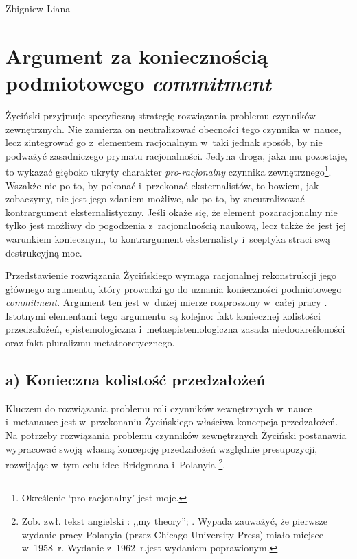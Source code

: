 \begin{artplenv}{Zbigniew Liana}
\section{Argument za koniecznością podmiotowego \textit{commitment}}
Życiński przyjmuje specyficzną strategię rozwiązania problemu czynników zewnętrznych. Nie zamierza on neutralizować obecności tego czynnika w~nauce, lecz zintegrować go z~elementem racjonalnym w~taki jednak sposób, by nie podważyć zasadniczego prymatu racjonalności. Jedyna droga, jaka mu pozostaje, to wykazać głęboko ukryty charakter \textit{pro}-\textit{racjonalny} czynnika zewnętrznego\footnote{Określenie ‘pro-racjonalny' jest moje.}. Wszakże nie po to, by pokonać i~przekonać eksternalistów, to bowiem, jak zobaczymy, nie jest jego zdaniem możliwe, ale po to, by zneutralizować kontrargument eksternalistyczny. Jeśli okaże się, że element pozaracjonalny nie tylko jest możliwy do pogodzenia z~racjonalnością naukową, lecz także że jest jej warunkiem koniecznym, to kontrargument eksternalisty i~sceptyka straci swą destrukcyjną moc.

Przedstawienie rozwiązania Życińskiego wymaga racjonalnej rekonstrukcji jego głównego argumentu, który prowadzi go do uznania konieczności podmiotowego \textit{commitment}. Argument ten jest w~dużej mierze rozproszony w~całej pracy
\parencite[][]{zycinski_teizm_1985}. %
 Istotnymi elementami tego argumentu są kolejno: fakt koniecznej kolistości przedzałożeń, epistemologiczna i~metaepistemologiczna zasada niedookreśloności oraz fakt pluralizmu metateoretycznego.

\subsection{a) Konieczna kolistość przedzałożeń}

Kluczem do rozwiązania problemu roli czynników zewnętrznych w~nauce i~metanauce jest w~przekonaniu Życińskiego
\parencite*[][s.~7]{zycinski_teizm_1985} %
 właściwa koncepcja przedzałożeń. Na potrzeby rozwiązania problemu czynników zewnętrznych Życiński postanawia wypracować swoją własną koncepcję przedzałożeń względnie presupozycji, rozwijając w~tym celu idee Bridgmana 
\parencite*[][]{bridgman_reflections_1950} %
 i~Polanyia 
\parencite*[][]{polanyi_personal_1962}%
\footnote{Zob. zwł. tekst angielski 
\parencite[][s.~202]{zycinski_structure_1988}: %
 ,,my theory''; 
\parencites[por.][s.~351]{zycinski_struktura_2013_liana}[zob. także][s.~145]{zycinski_structure_1988}[][s.~256]{zycinski_struktura_2013_liana}[][s.~187 przypis 283]{zycinski_elementy_1996}[][s.~254 przypis 18]{zycinski_elementy_2015}. %
 Wypada zauważyć, że pierwsze wydanie pracy Polanyia (przez Chicago University Press) miało miejsce w~1958~r. Wydanie z~1962~r.jest wydaniem poprawionym.}.


\end{artplenv}
